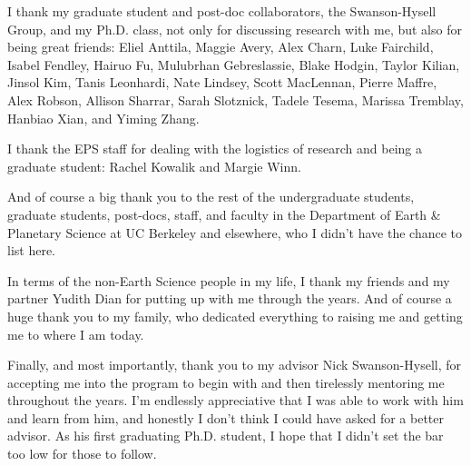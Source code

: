\documentclass{ucbthesis}
\begin{document}
\begin{frontmatter}
\begin{acknowledgements}
I thank my graduate student and post-doc collaborators, the Swanson-Hysell Group, and my Ph.D. class, not only for discussing research with me, but also for being great friends: Eliel Anttila, Maggie Avery, Alex Charn, Luke Fairchild, Isabel Fendley, Hairuo Fu, Mulubrhan Gebreslassie, Blake Hodgin, Taylor Kilian, Jinsol Kim, Tanis Leonhardi, Nate Lindsey, Scott MacLennan, Pierre Maffre, Alex Robson, Allison Sharrar, Sarah Slotznick, Tadele Tesema, Marissa Tremblay, Hanbiao Xian, and Yiming Zhang.

I thank the EPS staff for dealing with the logistics of research and being a graduate student: Rachel Kowalik and Margie Winn.

And of course a big thank you to the rest of the undergraduate students, graduate students, post-docs, staff, and faculty in the Department of Earth \& Planetary Science at UC Berkeley and elsewhere, who I didn't have the chance to list here.

In terms of the non-Earth Science people in my life, I thank my friends and my partner Yudith Dian for putting up with me through the years. And of course a huge thank you to my family, who dedicated everything to raising me and getting me to where I am today.

Finally, and most importantly, thank you to my advisor Nick Swanson-Hysell, for accepting me into the program to begin with and then tirelessly mentoring me throughout the years. I'm endlessly appreciative that I was able to work with him and learn from him, and honestly I don't think I could have asked for a better advisor. As his first graduating Ph.D. student, I hope that I didn't set the bar too low for those to follow.

\end{acknowledgements}

\end{frontmatter}


\pagestyle{headings}











\appendix



\end{document}
